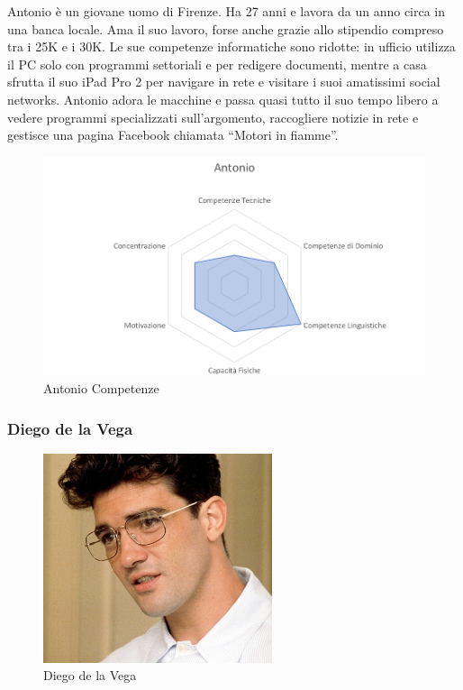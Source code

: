 \documentclass[12pt,italian,]{report}
\begin{document}
Antonio è un giovane uomo di Firenze. Ha 27 anni e lavora da un anno
circa in una banca locale. Ama il suo lavoro, forse anche grazie allo
stipendio compreso tra i 25K e i 30K. Le sue competenze informatiche
sono ridotte: in ufficio utilizza il PC solo con programmi settoriali e
per redigere documenti, mentre a casa sfrutta il suo iPad Pro 2 per
navigare in rete e visitare i suoi amatissimi social networks. Antonio
adora le macchine e passa quasi tutto il suo tempo libero a vedere
programmi specializzati sull'argomento, raccogliere notizie in rete e
gestisce una pagina Facebook chiamata ``Motori in fiamme''.

\begin{figure}[h]
\centering
\includegraphics{img/antonio_competenze.png}
\caption{Antonio Competenze}
\end{figure}

\hypertarget{diego-de-la-vega-1}{%
\subsubsection{Diego de la Vega}\label{diego-de-la-vega-1}}

\begin{figure}[h]
\centering
\includegraphics[width=0.6\textwidth,height=\textheight]{img/diego.jpg}
\caption{Diego de la Vega}
\end{figure}
\end{document}
